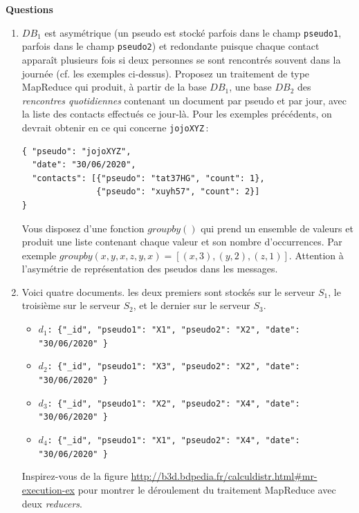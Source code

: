 \documentclass[11pt,a4paper]{article}
\begin{document}
\textbf{Questions}

\begin{enumerate}
  \item $DB_1$ est 
  asymétrique (un pseudo est stocké parfois dans le champ
    \texttt{pseudo1}, parfois dans le champ \texttt{pseudo2}) et  redondante
    puisque chaque contact apparaît plusieurs fois si deux personnes se sont
     rencontrés souvent dans la journée (cf. les exemples ci-dessus).    
     Proposez un traitement de type MapReduce qui produit, à partir
     de la base $DB_1$, une base $DB_2$ des \emph{rencontres quotidiennes}
     contenant un document par pseudo et par jour, avec la liste
    des contacts effectués ce jour-là. Pour les 
     exemples précédents, on devrait obtenir en ce qui concerne \texttt{jojoXYZ}\,:
     
\begin{small}
\begin{verbatim}
{ "pseudo": "jojoXYZ",
  "date": "30/06/2020",
  "contacts": [{"pseudo": "tat37HG", "count": 1},
               {"pseudo": "xuyh57", "count": 2}]
}
\end{verbatim}
\end{small}
    
    Vous disposez d'une fonction $groupby()$ qui prend
    un ensemble de valeurs et produit
    une liste contenant chaque valeur et son nombre d'occurrences. 
    Par  exemple $groupby (x, y, x, z, y, x) = [(x,3), (y,2), (z,1)]$.
   Attention à l'asymétrie de représentation
    des pseudos dans les messages. 
    
    \item Voici quatre documents. les deux premiers sont stockés
    sur le serveur $S_1$, le troisième sur le serveur $S_2$, et le dernier sur le serveur $S_3$.
    \begin{itemize}
       \item \texttt{$d_1$: \{"\_id", "pseudo1": "X1", "pseudo2": "X2", "date": "30/06/2020" \}}
       \item \texttt{$d_2$: \{"\_id", "pseudo1": "X3", "pseudo2": "X2", "date": "30/06/2020" \}}
       \item \texttt{$d_3$: \{"\_id", "pseudo1": "X2", "pseudo2": "X4", "date": "30/06/2020" \}}
       \item \texttt{$d_4$: \{"\_id", "pseudo1": "X1", "pseudo2": "X4", "date": "30/06/2020" \}}
    \end{itemize}
         Inspirez-vous de la figure \url{http://b3d.bdpedia.fr/calculdistr.html#mr-execution-ex}
    pour montrer le déroulement du traitement MapReduce avec deux \textit{reducers}. 
     

\end{enumerate}
\end{document}
